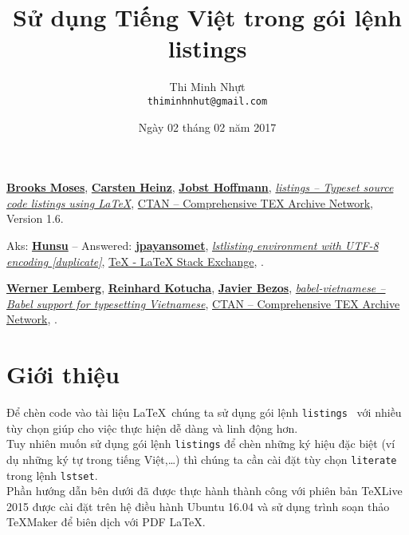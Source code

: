 \documentclass[12pt,a4paper]{article}
\title{\bfseries Sử dụng Tiếng Việt trong gói lệnh listings}
\author{Thi Minh Nhựt \bigskip \\ \tt thiminhnhut@gmail.com}
\date{Ngày 02 tháng 02 năm 2017}
\begin{document}
\maketitle
\tableofcontents

\begin{thebibliography}{99}
   \href{https://www.ctan.org/author/moses}{\textbf{Brooks Moses}}, \href{https://www.ctan.org/author/heinz}{\textbf{Carsten Heinz}}, \href{https://www.ctan.org/author/hoffmann}{\textbf{Jobst Hoffmann}}, \href{https://www.ctan.org/pkg/listings}{\emph{listings – Typeset source code listings using LaTeX}}, \href{https://www.ctan.org/}{CTAN -- Comprehensive TEX Archive Network}, Version 1.6.

   Aks: \href{https://goo.gl/9VxuIW}{\textbf{Hunsu}} -- Answered: \href{https://goo.gl/3fO9ec}{\textbf{jpayansomet}}, \href{https://goo.gl/8yvdB2}{\emph{lstlisting environment with UTF-8 encoding [duplicate]}}, \href{http://tex.stackexchange.com/}{TeX - LaTeX Stack Exchange}, .

   \href{https://www.ctan.org/author/lemberg}{\textbf{Werner Lemberg}}, \href{https://www.ctan.org/author/kotucha}{\textbf{Reinhard Kotucha}}, \href{https://www.ctan.org/author/bezos}{\textbf{Javier Bezos}}, \href{https://www.ctan.org/pkg/babel-vietnamese}{\emph{babel-vietnamese – Babel support for typesetting Vietnamese}}, \href{https://www.ctan.org/}{CTAN -- Comprehensive TEX Archive Network}, .
\end{thebibliography}

\section{Giới thiệu}
Để chèn code vào tài liệu \LaTeX\, chúng ta sử dụng gói lệnh \verb|listings|~\cite{listings-ctan} với nhiều tùy chọn giúp cho việc thực hiện dễ dàng và linh động hơn.\\

Tuy nhiên muốn sử dụng gói lệnh \verb|listings| để chèn những ký hiệu đặc biệt (ví dụ những ký tự trong tiếng Việt,\ldots) thì chúng ta cần cài đặt tùy chọn \verb|literate| trong lệnh \verb|lstset|.\\

Phần hướng dẫn bên dưới đã được thực hành thành công với phiên bản \TeX Live 2015 được cài đặt trên hệ điều hành Ubuntu 16.04 và sử dụng trình soạn thảo \TeX Maker để biên dịch với PDF \LaTeX. \\
\end{document}
